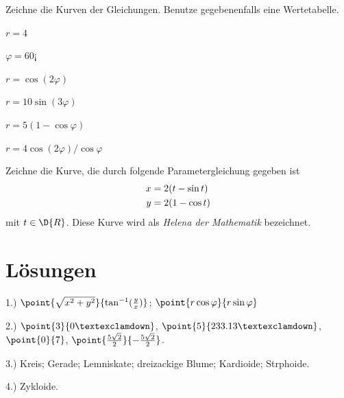 \documentclass[%
11pt,%
twoside,%
titlepage,%
a4page,%
german,%
headsepline%
]{scrartcl}
\begin{document}
\begin{ueb}
Zeichne die Kurven der Gleichungen. Benutze gegebenenfalls eine Wertetabelle.

  \begin{minipage}{3.5cm}
    \begin{enumeratea}
      \item $r=4$
      \item $\varphi=60¡$
      \item $r=\cos(2\varphi)$
    \end{enumeratea}
  \end{minipage}
  \begin{minipage}{4cm}
    \begin{enumeratea}\addtocounter{enumi}{3}
      \item $r=10\sin(3\varphi)$
      \item $r=5(1-\cos\varphi)$
      \item $r=4\cos(2\varphi)/\cos\varphi$
    \end{enumeratea}
  \end{minipage}
\end{ueb}

\begin{ueb}
Zeichne die Kurve, die durch folgende Parametergleichung gegeben ist
\begin{align}
x&=2(t-\sin t)\notag\\
y&=2(1-\cos t)\notag
\end{align}
mit $t\in\D{R}$.
Diese Kurve wird als \emph{Helena der Mathematik} bezeichnet.
\end{ueb}

\section*{L\"osungen}

\hspace*{2.7ex} 1.) $\point{\sqrt{x^2+y^2}}{\tan^{-1}(\frac{y}{x})}$; $\point{r\cos\varphi}{r\sin\varphi}$

2.) $\point{3}{0¡}$, $\point{5}{233.13¡}$, $\point{0}{7}$, $\point{\frac{5\sqrt{2}}{2}}{-\frac{5\sqrt{2}}{2}}$.

3.) Kreis; Gerade; Lemniskate; dreizackige Blume; Kardioide; Strphoide.

4.) Zykloide.

%
%
\end{document}
